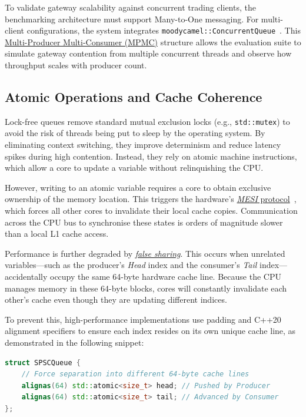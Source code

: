 

To validate gateway scalability against concurrent trading clients, 
the benchmarking architecture must support Many-to-One messaging. 
For multi-client configurations, the system integrates 
\texttt{moodycamel::ConcurrentQueue}~\citep{moodycamel_concurrentqueue}. 
This \hyperref[app:glossary]{Multi-Producer Multi-Consumer (MPMC)} structure allows the 
evaluation suite to simulate gateway contention from multiple 
concurrent threads and observe how throughput scales with producer count.



\subsection{Atomic Operations and Cache Coherence}
Lock-free queues remove standard mutual exclusion locks (e.g., \texttt{std::mutex}) 
to avoid the risk of threads being put to sleep by the operating system. 
By eliminating context switching, they improve determinism and reduce latency 
spikes during high contention. Instead, they rely on atomic machine 
instructions, which allow a core to update a variable without 
relinquishing the CPU.

However, writing to an atomic variable requires a core to obtain exclusive 
ownership of the memory location. This triggers the hardware's 
\hyperref[app:glossary]{\textit{MESI} protocol}~\citep{patterson2013cod}, which forces all other 
cores to invalidate their local cache copies. 
Communication across the CPU bus to synchronise these states is 
orders of magnitude slower than a local L1 cache access.

Performance is further degraded by \hyperref[app:glossary]{\textit{false sharing}}. This occurs when 
unrelated variables—such as the producer's \textit{Head} index and the 
consumer's \textit{Tail} index—accidentally occupy the same 64-byte 
hardware cache line. Because the CPU manages memory in these 64-byte blocks, 
cores will constantly invalidate each other's cache even though they 
are updating different indices.

To prevent this, high-performance implementations use padding and 
C++20 alignment specifiers to ensure each index resides on its own 
unique cache line, as demonstrated in the following snippet:

\begin{lstlisting}[language=C++, basicstyle=\small\ttfamily, frame=single, keywordstyle=\color{blue}]
struct SPSCQueue {
    // Force separation into different 64-byte cache lines
    alignas(64) std::atomic<size_t> head; // Pushed by Producer
    alignas(64) std::atomic<size_t> tail; // Advanced by Consumer
};
\end{lstlisting}

